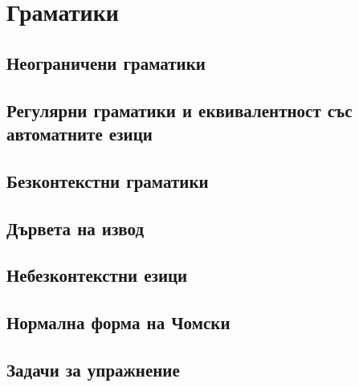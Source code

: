 \chapter{Граматики}

\section{Неограничени граматики}

\section{Регулярни граматики и еквивалентност със автоматните езици}

\section{Безконтекстни граматики}

\section{Дървета на извод}

\section{Небезконтекстни езици}

\section{Нормална форма на Чомски}

\section{Задачи за упражнение}